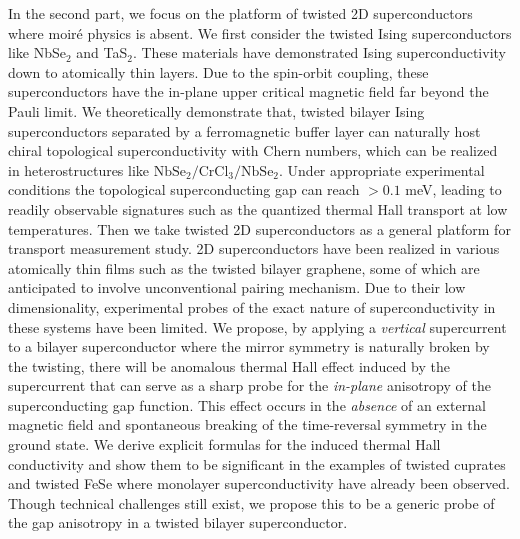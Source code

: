 In the second part, we focus on the platform of twisted 2D superconductors where moir\'e physics is absent. We first consider the twisted Ising superconductors like NbSe$_2$ and TaS$_2$. These materials have demonstrated Ising superconductivity down to atomically thin layers. Due to the spin-orbit coupling, these superconductors have the in-plane upper critical magnetic field far beyond the Pauli limit. We theoretically demonstrate that, twisted bilayer Ising superconductors separated by a ferromagnetic buffer layer can naturally host chiral topological superconductivity with Chern numbers, which can be realized in heterostructures like $\mathrm{NbSe_2/CrCl_3/NbSe_2}$. Under appropriate experimental conditions the topological superconducting gap can reach $>0.1$ meV, leading to readily observable signatures such as the quantized thermal Hall transport at low temperatures. Then we take twisted 2D superconductors as a general platform for transport measurement study. 2D superconductors have been realized in various atomically thin films such as the twisted bilayer graphene, some of which are anticipated to involve unconventional pairing mechanism. Due to their low dimensionality, experimental probes of the exact nature of superconductivity in these systems have been limited. We propose, by applying a \emph{vertical} supercurrent to a bilayer superconductor where the mirror symmetry is naturally broken by the twisting, there will be anomalous thermal Hall effect induced by the supercurrent that can serve as a sharp probe for the \emph{in-plane} anisotropy of the superconducting gap function. This effect occurs in the \emph{absence} of an external magnetic field and spontaneous breaking of the time-reversal symmetry in the ground state. We derive explicit formulas for the induced thermal Hall conductivity and show them to be significant in the examples of twisted cuprates and twisted FeSe where monolayer superconductivity have already been observed. Though technical challenges still exist, we propose this to be a generic probe of the gap anisotropy in a twisted bilayer superconductor.